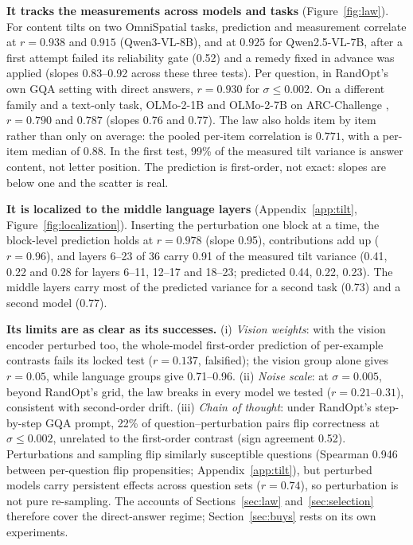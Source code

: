 \documentclass{article}
\begin{document}
\textbf{It tracks the measurements across models and tasks} (Figure~\ref{fig:law}). For content tilts on two OmniSpatial
tasks, prediction and measurement correlate at $r = 0.938$ and $0.915$ (Qwen3-VL-8B), and at $0.925$ for Qwen2.5-VL-7B,
after a first attempt failed its reliability gate (0.52) and a remedy fixed in advance was applied (slopes 0.83--0.92
across these three tests). Per question, in RandOpt's own GQA setting with direct answers, $r = 0.930$ for $\sigma \le
0.002$. On a different family and a text-only task, OLMo-2-1B and OLMo-2-7B on ARC-Challenge \citep{clark2018arc}, $r =
0.790$ and $0.787$ (slopes 0.76 and 0.77). The law also holds item by item rather than only on average: the pooled
per-item correlation is $0.771$, with a per-item median of 0.88. In the first test, 99\% of the measured tilt variance
is answer content, not letter position. The prediction is first-order, not exact: slopes are below one and the scatter
is real.

\textbf{It is localized to the middle language layers} (Appendix~\ref{app:tilt}, Figure~\ref{fig:localization}).
Inserting the perturbation one block at a time, the block-level prediction holds at $r = 0.978$ (slope 0.95),
contributions add up ($r = 0.96$), and layers 6--23 of 36 carry 0.91 of the measured tilt variance (0.41, 0.22 and 0.28
for layers 6--11, 12--17 and 18--23; predicted 0.44, 0.22, 0.23). The middle layers carry most of the predicted
variance for a second task (0.73) and a second model (0.77).

\textbf{Its limits are as clear as its successes.} (i) \emph{Vision weights}: with the vision encoder perturbed too, the
whole-model first-order prediction of per-example contrasts fails its locked test ($r = 0.137$, falsified); the vision
group alone gives $r = 0.05$, while language groups give 0.71--0.96. (ii) \emph{Noise scale}: at $\sigma = 0.005$, beyond
RandOpt's grid, the law breaks in every model we tested ($r = 0.21$--$0.31$), consistent with second-order drift.
(iii) \emph{Chain of thought}: under RandOpt's step-by-step GQA prompt, 22\% of question--perturbation pairs flip
correctness at $\sigma \le 0.002$, unrelated to the first-order contrast (sign agreement 0.52). Perturbations and
sampling flip similarly susceptible questions (Spearman 0.946 between per-question flip propensities;
Appendix~\ref{app:tilt}), but perturbed models carry persistent effects across question sets ($r = 0.74$), so
perturbation is not pure re-sampling. The accounts of Sections~\ref{sec:law} and~\ref{sec:selection} therefore cover
the direct-answer regime; Section~\ref{sec:buys} rests on its own experiments.
\end{document}
